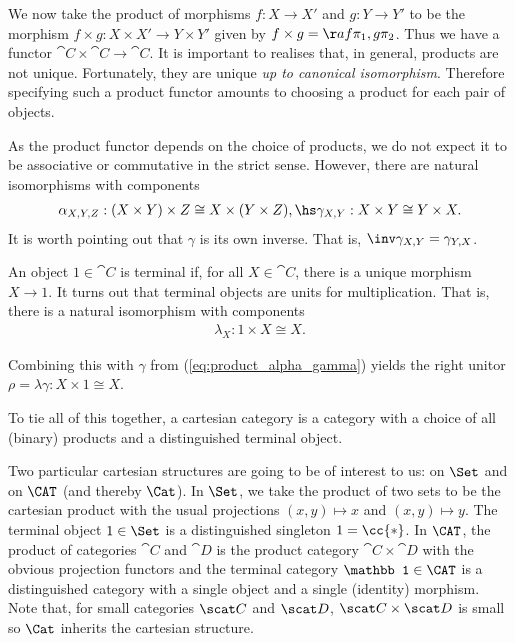 We now take the product of morphisms $f:X\to X'$ and $g:Y\to Y'$ to be the
morphism $f\times g:X\times X'\to Y\times Y'$ given by $f\times
g=\aa{f\pi_1,g\pi_2}$. Thus we have a functor $\cat{C}\times\cat{C}\to\cat{C}$.
It is important to realises that, in general, products are not unique.
Fortunately, they are unique \emph{up to canonical isomorphism}. Therefore
specifying such a product functor amounts to choosing a product for each pair
of objects.

As the product functor depends on the choice of products, we do not expect it to
be associative or commutative in the strict sense. However, there are natural
isomorphisms with components
\begin{align}\label{eq:product_alpha_gamma}
  \alpha_{X,Y,Z} : (X\times Y)\times Z \cong X\times (Y\times Z), \hs
  \gamma_{X,Y} : X\times Y \cong Y\times X.
\end{align}
It is worth pointing out that $\gamma$ is its own inverse. That is,
$\inv\gamma_{X,Y}=\gamma_{Y,X}$.

An object $1\in\cat{C}$ is terminal if, for all $X\in\cat{C}$, there is a unique
morphism $X\to 1$. It turns out that terminal objects are units for
multiplication. That is, there is a natural isomorphism with components
\begin{align*}
  \lambda_X : 1\times X \cong X.
\end{align*}

Combining this with $\gamma$ from (\ref{eq:product_alpha_gamma}) yields the
right unitor $\rho=\lambda\gamma:X\times 1\cong X$.

To tie all of this together, a cartesian category is a category with a choice of
all (binary) products and a distinguished terminal object.

\begin{example}
  Two particular cartesian structures are going to be of interest to us: on $\Set$
  and on $\CAT$ (and thereby $\Cat$). In $\Set$, we take the product of two sets
  to be the cartesian product with the usual projections $(x,y)\mapsto x$ and
  $(x,y)\mapsto y$. The terminal object $1\in\Set$ is a distinguished singleton
  $1=\cc{*}$. In $\CAT$, the product of categories $\cat{C}$ and $\cat{D}$ is the
  product category $\cat{C}\times\cat{D}$ with the obvious projection functors and
  the terminal category $\mathbb 1\in\CAT$ is a distinguished category with a
  single object and a single (identity) morphism. Note that, for small categories
  $\scat C$ and $\scat D$, $\scat C\times\scat D$ is small so $\Cat$ inherits the
  cartesian structure.
\end{example}

